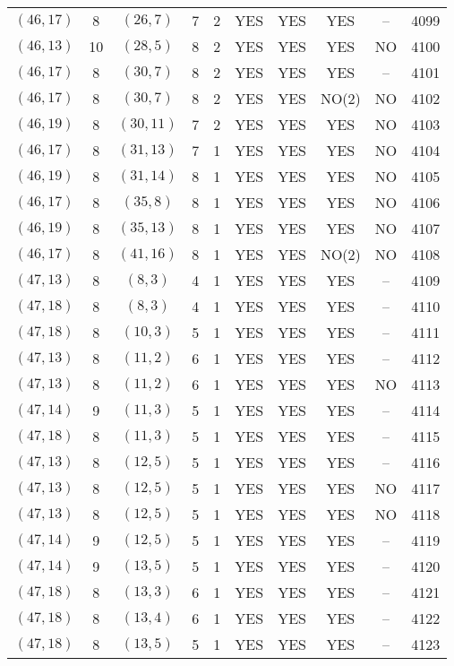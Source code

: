 \begin{longtable}{|c|c|c|c|c|c|c|c|c|c|}
$(46, 17)$ & 8 & $(26, 7)$ & 7 & 2 & YES & YES & YES & -- & 4099\\
$(46, 13)$ & 10 & $(28, 5)$ & 8 & 2 & YES & YES & YES & NO & 4100\\
$(46, 17)$ & 8 & $(30, 7)$ & 8 & 2 & YES & YES & YES & -- & 4101\\
$(46, 17)$ & 8 & $(30, 7)$ & 8 & 2 & YES & YES & NO(2) & NO & 4102\\
$(46, 19)$ & 8 & $(30, 11)$ & 7 & 2 & YES & YES & YES & NO & 4103\\
$(46, 17)$ & 8 & $(31, 13)$ & 7 & 1 & YES & YES & YES & NO & 4104\\
$(46, 19)$ & 8 & $(31, 14)$ & 8 & 1 & YES & YES & YES & NO & 4105\\
$(46, 17)$ & 8 & $(35, 8)$ & 8 & 1 & YES & YES & YES & NO & 4106\\
$(46, 19)$ & 8 & $(35, 13)$ & 8 & 1 & YES & YES & YES & NO & 4107\\
$(46, 17)$ & 8 & $(41, 16)$ & 8 & 1 & YES & YES & NO(2) & NO & 4108\\
$(47, 13)$ & 8 & $(8, 3)$ & 4 & 1 & YES & YES & YES & -- & 4109\\
$(47, 18)$ & 8 & $(8, 3)$ & 4 & 1 & YES & YES & YES & -- & 4110\\
$(47, 18)$ & 8 & $(10, 3)$ & 5 & 1 & YES & YES & YES & -- & 4111\\
$(47, 13)$ & 8 & $(11, 2)$ & 6 & 1 & YES & YES & YES & -- & 4112\\
$(47, 13)$ & 8 & $(11, 2)$ & 6 & 1 & YES & YES & YES & NO & 4113\\
$(47, 14)$ & 9 & $(11, 3)$ & 5 & 1 & YES & YES & YES & -- & 4114\\
$(47, 18)$ & 8 & $(11, 3)$ & 5 & 1 & YES & YES & YES & -- & 4115\\
$(47, 13)$ & 8 & $(12, 5)$ & 5 & 1 & YES & YES & YES & -- & 4116\\
$(47, 13)$ & 8 & $(12, 5)$ & 5 & 1 & YES & YES & YES & NO & 4117\\
$(47, 13)$ & 8 & $(12, 5)$ & 5 & 1 & YES & YES & YES & NO & 4118\\
$(47, 14)$ & 9 & $(12, 5)$ & 5 & 1 & YES & YES & YES & -- & 4119\\
$(47, 14)$ & 9 & $(13, 5)$ & 5 & 1 & YES & YES & YES & -- & 4120\\
$(47, 18)$ & 8 & $(13, 3)$ & 6 & 1 & YES & YES & YES & -- & 4121\\
$(47, 18)$ & 8 & $(13, 4)$ & 6 & 1 & YES & YES & YES & -- & 4122\\
$(47, 18)$ & 8 & $(13, 5)$ & 5 & 1 & YES & YES & YES & -- & 4123\\

\end{longtable}
